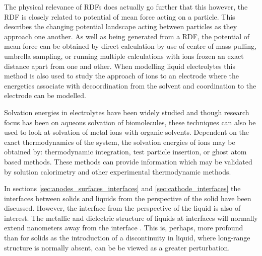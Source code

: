 \documentclass[../main.tex]{subfiles}
\begin{document}
The physical relevance of RDFs does actually go further that this however, the RDF is closely related to potential of mean force acting on a particle. This describes the changing potential landscape acting between particles as they approach one another\cite{frenkel_understanding_2002}. As well as being generated from a RDF, the potential of mean force can be obtained by direct calculation by use of centre of mass pulling, umbrella sampling\cite{lindahl_gromacs_2021}, or running multiple calculations with ions frozen an exact distance apart from one and other. When modelling liquid electrolytes this method is also used to study the approach of ions to an electrode where the energetics associate with decoordination from the solvent and coordination to the electrode can be modelled\cite{coles_nanostructure_2017,sergeev_electrodeelectrolyte_2017}.


Solvation energies in electrolytes have been widely studied and though research focus has been on aqueous solvation of biomolecules, these techniques can also be used to look at solvation of metal ions with organic solvents. Dependent on the exact thermodynamics of the system, the solvation energies of ions may be obtained by: thermodynamic integration, test particle insertion, or ghost atom based methods. These methods can provide information which may be validated by solution calorimetry and other experimental thermodynamic methods.


In sections \ref{sec:anodes_surfaces_interfaces} and \ref{sec:cathode_interfaces} the interfaces between solids and liquids from the perspective of the solid have been discussed. However, the interface from the perspective of the liquid is also of interest. The metallic and dielectric structure of liquids at interfaces will normally extend nanometers away from the interface \cite{smith_electrostatic_2016}. This is, perhaps, more profound than for solids as the introduction of a discontinuity in liquid, where long-range structure is normally absent, can be be viewed as a greater perturbation.
\end{document}
